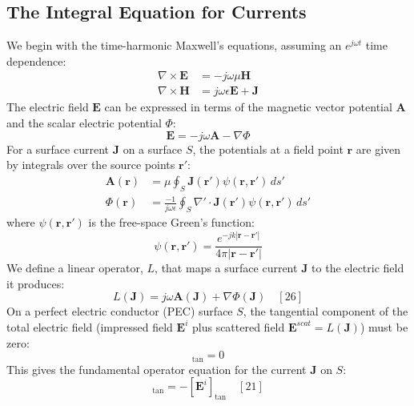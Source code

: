 \documentclass[11pt]{article}
\newcommand{\vect}[1]{\mathbf{#1}}
\theoremstyle{definition}
\begin{document}
\subsection{The Integral Equation for Currents}
We begin with the time-harmonic Maxwell's equations, assuming an $e^{j\omega t}$ time dependence:
\begin{align}
\nabla \times \vect{E} &= -j\omega\mu\vect{H} \\
\nabla \times \vect{H} &= j\omega\epsilon\vect{E} + \vect{J}
\end{align}
The electric field $\vect{E}$ can be expressed in terms of the magnetic vector potential $\vect{A}$ and the scalar electric potential $\Phi$:
\begin{equation}
\vect{E} = -j\omega\vect{A} - \nabla\Phi
\end{equation}
For a surface current $\vect{J}$ on a surface $S$, the potentials at a field point $\vect{r}$ are given by integrals over the source points $\vect{r'}$:
\begin{align}
\vect{A}(\vect{r}) &= \mu \oint_S \vect{J}(\vect{r'}) \psi(\vect{r}, \vect{r'}) \,ds' \label{eq:A_potential} \\
\Phi(\vect{r}) &= \frac{-1}{j\omega\epsilon} \oint_S \nabla' \cdot \vect{J}(\vect{r'}) \psi(\vect{r}, \vect{r'}) \,ds' \label{eq:Phi_potential}
\end{align}
where $\psi(\vect{r}, \vect{r'})$ is the free-space Green's function:
\begin{equation}
\psi(\vect{r}, \vect{r'}) = \frac{e^{-jk|\vect{r}-\vect{r'}|}}{4\pi|\vect{r}-\vect{r'}|}
\end{equation}
We define a linear operator, $L$, that maps a surface current $\vect{J}$ to the electric field it produces:
\begin{equation}
L(\vect{J}) = j\omega\vect{A}(\vect{J}) + \nabla\Phi(\vect{J}) \quad [26]
\end{equation}
On a perfect electric conductor (PEC) surface $S$, the tangential component of the total electric field (impressed field $\vect{E}^i$ plus scattered field $\vect{E}^{scat} = L(\vect{J})$) must be zero:
\begin{equation}
[\vect{E}^{i} + L(\vect{J})]_{\text{tan}} = 0
\end{equation}
This gives the fundamental operator equation for the current $\vect{J}$ on $S$:
\begin{equation}
[L(\vect{J})]_{\text{tan}} = -[\vect{E}^{i}]_{\text{tan}} \quad [21]
\end{equation}
\end{document}
